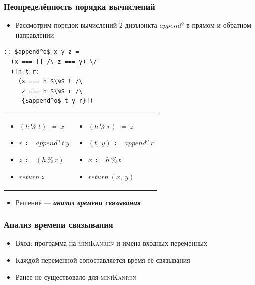\documentclass{beamer}
\newcommand{\miniKanren}{\textsc{miniKanren}}
\begin{document}
\lstset{language=haskell}
\begin{frame}[fragile]\frametitle{Неопределённость порядка вычислений}
\begin{itemize}
    \item Рассмотрим порядок вычислений 2 дизъюнкта $append^o$ в прямом и обратном направлении
\end{itemize}
\begin{lstlisting}
:: $append^o$ x y z =
  (x === [] /\ z === y) \/
  ([h t r:
    (x === h $\%$ t /\
     z === h $\%$ r /\
     {$append^o$ t y r}])
\end{lstlisting}
\begin{tabular}{p{5cm} p{5cm}}
    \begin{center}
        \begin{itemize}
            \item $(h~\%~t)~\coloneqq~x$
            \item $r~\coloneqq~append^o~t~y$
            \item $z~\coloneqq~(h~\%~r)$
            \item $return \ z$
        \end{itemize}
    \end{center}
&
    \begin{center}
        \begin{itemize}
            \item $(h~\%~r)~\coloneqq~z$
            \item $(t,~y)~\coloneqq~append^o~r$
            \item $x~\coloneqq~h~\%~t$
            \item $return \ (x, \ y)$
        \end{itemize}
    \end{center}
\end{tabular}
\begin{itemize}
    \item Решение --- \textbf{\emph{анализ времени связывания}}
\end{itemize}
\end{frame}

\begin{frame}\frametitle{Анализ времени связывания}
\begin{itemize}
    \item Вход: программа на \miniKanren{} и имена входных переменных
    \item Каждой переменной сопоставляется время её связывания
    \item Ранее не существовало для \miniKanren{}
\end{itemize}
\end{frame}
\end{document}

